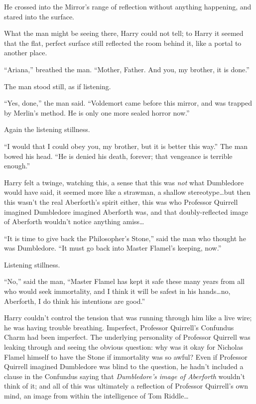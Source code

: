 He crossed into the Mirror’s range of reflection without anything happening, and stared into the surface.

What the man might be seeing there, Harry could not tell; to Harry it seemed that the flat, perfect surface still reflected the room behind it, like a portal to another place.

“Ariana,” breathed the man. “Mother, Father. And you, my brother, it is done.”

The man stood still, as if listening.

“Yes, done,” the man said. “Voldemort came before this mirror, and was trapped by Merlin’s method. He is only one more sealed horror now.”

Again the listening stillness.

“I would that I could obey you, my brother, but it is better this way.” The man bowed his head. “He is denied his death, forever; that vengeance is terrible enough.”

Harry felt a twinge, watching this, a sense that this was \emph{not} what Dumbledore would have said, it seemed more like a strawman, a shallow stereotype…but then this wasn’t the real Aberforth’s spirit either, this was who Professor Quirrell imagined Dumbledore imagined Aberforth was, and that doubly-reflected image of Aberforth wouldn’t notice anything amiss…

“It is time to give back the Philosopher’s Stone,” said the man who thought he was Dumbledore. “It must go back into Master Flamel’s keeping, now.”

Listening stillness.

“No,” said the man, “Master Flamel has kept it safe these many years from all who would seek immortality, and I think it will be safest in his hands…no, Aberforth, I do think his intentions are good.”

Harry couldn’t control the tension that was running through him like a live wire; he was having trouble breathing. Imperfect, Professor Quirrell’s Confundus Charm had been imperfect. The underlying personality of Professor Quirrell was leaking through and seeing the obvious question: why was it okay for Nicholas Flamel himself to have the Stone if immortality was so awful? Even if Professor Quirrell imagined Dumbledore was blind to the question, he hadn’t included a clause in the Confundus saying that \emph{Dumbledore’s image of Aberforth} wouldn’t think of it; and all of this was ultimately a reflection of Professor Quirrell’s own mind, an image from within the intelligence of Tom Riddle…

